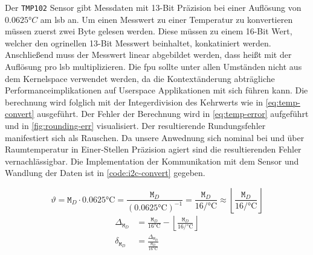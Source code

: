 



Der \texttt{TMP102} Sensor gibt Messdaten mit 13-Bit Präzision bei einer Auflösung von $0.0625\si{\degree C}$ am \gls{lsb} an.
Um einen Messwert zu einer Temperatur zu konvertieren müssen zuerst zwei Byte gelesen werden.
Diese müssen zu einem 16-Bit Wert, welcher den ogrinellen 13-Bit Messwert beinhaltet, konkatiniert werden.
Anschlie{\ss}end muss der Messwert linear abgebildet werden, dass hei{\ss}t mit der Auflösung pro \gls{lsb} multiplizieren.
Die \gls{fpu} sollte unter allen Umständen nicht aus dem Kernelspace verwendet werden,
da die Kontextänderung abträgliche Performanceimplikationen auf Userspace Applikationen mit sich führen kann.
Die berechnung wird folglich mit der Integerdivision des Kehrwerts wie in \autoref{eq:temp-convert} ausgeführt.
Der Fehler der Berechnung wird in \autoref{eq:temp-error} aufgeführt und in \autoref{fig:rounding-err} visualisiert.
Der resultierende Rundungsfehler manifestiert sich als Rauschen.
Da unsere Anwednung sich nominal bei und über Raumtemperatur in Einer-Stellen Präzision agiert sind die resultierenden Fehler vernachlässigbar.
Die Implementation der Kommunikation mit dem Sensor und Wandlung der Daten ist in \autoref{code:i2c-convert} gegeben.

\begin{equation}
    \vartheta = \texttt{M}_D \cdot 0.0625\si{\celsius} = \frac{\texttt{M}_D}{\left(0.0625\si{\celsius}\right)^{-1}} = \frac{\texttt{M}_D}{16\si{\per\celsius}} \approx \left\lfloor\frac{\texttt{M}_D}{16\si{\per\celsius}}\right\rfloor
    \label{eq:temp-convert}
\end{equation}
\begin{equation}
    \begin{aligned}
        \Delta_{\texttt{M}_D} &= \frac{\texttt{M}_D}{16\si{\celsius}} - \left\lfloor\frac{\texttt{M}_D}{16\si{\per\celsius}}\right\rfloor \\[2ex]
        \delta_{\texttt{M}_D} &= \frac{\Delta_{\texttt{M}_D}}{\frac{\texttt{M}_D}{16\si{\celsius}} }\\[2ex]
    \end{aligned}
    \label{eq:temp-error}
\end{equation}

